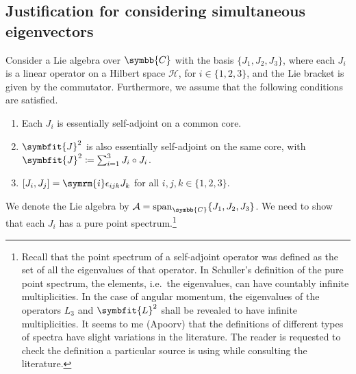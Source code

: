 \documentclass[12pt, a4 paper]{article}
\let\symcal\mathcal
\theoremstyle{definition}
\newcommand{\cc}{\symbb{C}}
\newcommand{\hilbert}{\symcal{H}}
\renewcommand{\i}{\symrm{i}}
\DeclareMathOperator{\spann}{span}
\begin{document}
    \subsection{Justification for considering simultaneous eigenvectors}

    Consider a Lie algebra over \(\cc\) with the basis \(\{J_1, J_2, J_3\}\), where each \(J_i\) is a linear operator on a Hilbert space \(\hilbert\), for \(i \in \{1, 2, 3\}\), and the Lie bracket is given by the commutator. Furthermore, we assume that the following conditions are satisfied.
    \begin{enumerate}
        \item Each \(J_i\) is essentially self-adjoint on a common core.
        \item \(\symbfit{J}^2\) is also essentially self-adjoint on the same core, with \(\symbfit{J}^2 \coloneq \sum_{i=1}^3 J_i \circ J_i\).
        \item \([J_i, J_j] = \i \epsilon_{ijk} J_k\) for all \(i, j, k \in \{1, 2, 3\}\).
    \end{enumerate}
    We denote the Lie algebra by \(\symcal{A} = \spann_{\cc}\{J_1, J_2, J_3\}\). We need to show that each \(J_i\) has a pure point spectrum.\footnote{Recall that the point spectrum of a self-adjoint operator was defined as the set of all the eigenvalues of that operator. In Schuller's definition of the pure point spectrum, the elements, i.e.\ the eigenvalues, can have countably infinite multiplicities. In the case of angular momentum, the eigenvalues of the operators \(L_3\) and \(\symbfit{L}^2\) shall be revealed to have infinite multiplicities. It seems to me (Apoorv) that the definitions of different types of spectra have slight variations in the literature. The reader is requested to check the definition a particular source is using while consulting the literature.}
\end{document}
